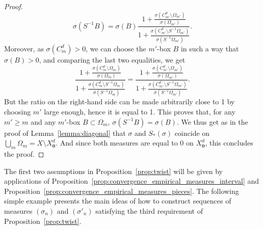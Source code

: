 \documentclass[AHL,Unicode,longabstracts]{cedram}
\newcommand{\cd}{C^{d}}
\newcommand{\bz}{\boldsymbol{0}}
\newcommand{\ovC}{\Omega}
\begin{document}
\begin{proof}
\[
\sigma(S^{-1}B)={\sigma(B)}
\dfrac{1+ \frac{\sigma(\cd_{m'}\setminus \ovC_{m'})}{\sigma(\ovC_{m'})} }{1+ \frac{\sigma(\cd_{m'}\setminus S^{-1}\ovC_{m'})}{\sigma(S^{-1}\ovC_{m'})} }.
\]
Moreover, as $\sigma(\cd_m)>0$, we can choose the $m'$-box $B$ in such a way that $\sigma(B)>0$, and comparing the last two equalities, we get
\[
\dfrac{1+ \frac{\sigma(\cd_m\setminus \ovC_m)}{\sigma(\ovC_m)} }{1+ \frac{\sigma(\cd_m\setminus S^{-1}\ovC_m)}{\sigma(S^{-1}\ovC_m)} } =
\dfrac{1+ \frac{\sigma(\cd_{m'}\setminus \ovC_{m'})}{\sigma(\ovC_{m'})} }{1+ \frac{\sigma(\cd_{m'}\setminus S^{-1}\ovC_{m'})}{\sigma(S^{-1}\ovC_{m'})} }.
\]
But the ratio on the right-hand side can be made arbitrarily close to 1 by choosing $m'$ large enough, hence it is equal to 1. This proves that, for any $m'\ge m$ and any $m'$-box $B\subset \ovC_m$, $\sigma(S^{-1}B)=\sigma(B)$. We thus get as in the proof of Lemma~\ref{lemma:diagonal} that $\sigma$ and $S_*(\sigma)$ coincide on $\bigcup_m \ovC_m=X\setminus X_{\bz}^d$. And since both measures are equal to 0 on $X_{\bz}^d$, this concludes the proof.
\end{proof}

The first two assumptions in Proposition~\ref{prop:twist} will be given by applications of Proposition~\ref{prop:convergence_empirical_measures_interval} and Proposition~\ref{prop:convergence_empirical_measures_pieces}. The following simple example presents the main ideas of how to construct sequences of measures $(\sigma_n)$ and $(\sigma'_n)$ satisfying the third requirement of Proposition~\ref{prop:twist}.
\end{document}
